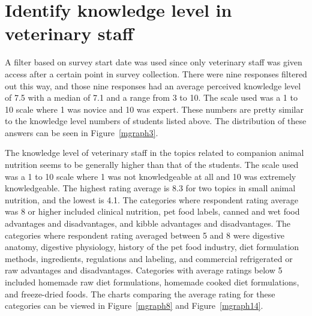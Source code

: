 \section{Identify knowledge level in veterinary staff}
A filter based on survey start date was used since only veterinary staff was given access after a certain point in survey collection. There were nine responses filtered out this way, and those nine responses had an average perceived knowledge level of 7.5 with a median of 7.1 and a range from 3 to 10. The scale used was a 1 to 10 scale where 1 was novice and 10 was expert. These numbers are pretty similar to the knowledge level numbers of students listed above. The distribution of these answers can be seen in Figure~\ref{mgraph3}.
\par The knowledge level of veterinary staff in the topics related to companion animal nutrition seems to be generally higher than that of the students. The scale used was a 1 to 10 scale where 1 was not knowledgeable at all and 10 was extremely knowledgeable. The highest rating average is 8.3 for two topics in small animal nutrition, and the lowest is 4.1. The categories where respondent rating average was 8 or higher included clinical nutrition, pet food labels, canned and wet food advantages and disadvantages, and kibble advantages and disadvantages. The categories where respondent rating averaged between 5 and 8 were digestive anatomy, digestive physiology, history of the pet food industry, diet formulation methods, ingredients, regulations and labeling, and commercial refrigerated or raw advantages and disadvantages. Categories with average ratings below 5 included homemade raw diet formulations, homemade cooked diet formulations, and freeze-dried foods. The charts comparing the average rating for these categories can be viewed in Figure~\ref{mgraph8} and Figure~\ref{mgraph14}.
